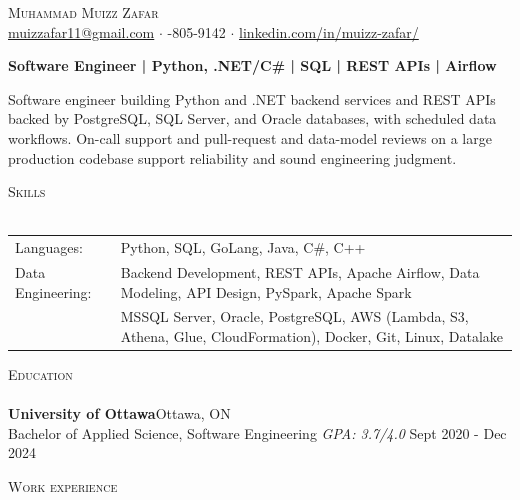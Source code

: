 \documentclass[a4paper]{article}
\newcommand{\lineunder} {
    \vspace*{-8pt} \\
    \hspace*{-18pt} \hrulefill \\
}
\newcommand{\header} [1] {
    {\hspace*{-18pt}\vspace*{6pt} \textsc{#1}}
    \vspace*{-6pt} \lineunder
}
\begin{document}
\vspace*{-40pt}

\vspace*{-10pt}
\begin{center}
	{\Huge \scshape {Muhammad Muizz Zafar}}\\
	\faSend \space \href{mailto:muizzafar11@gmail.com}{muizzafar11@gmail.com} $\cdot$ \faPhoneSquare {}-805-9142 $\cdot$ \faLinkedinSquare \space \href{https://www.linkedin.com/in/muizz-zafar/}{linkedin.com/in/muizz-zafar/}
	\\
\end{center}

\vspace{-5pt}
\begin{center}
\textbf{Software Engineer | Python, .NET/C\# | SQL | REST APIs | Airflow}
\end{center}
\begin{center}
Software engineer building Python and .NET backend services and REST APIs backed by PostgreSQL, SQL Server, and Oracle databases, with scheduled data workflows. On-call support and pull-request and data-model reviews on a large production codebase support reliability and sound engineering judgment.
\end{center}

\header{Skills}
\begin{tabular}{ l l }
	Languages: 
& Python, SQL, GoLang, Java, C\#, C++ \\

Data Engineering: 
& Backend Development, REST APIs, Apache Airflow, Data Modeling, API Design, PySpark, Apache Spark\\
& MSSQL Server, Oracle, PostgreSQL, AWS (Lambda, S3, Athena, Glue, CloudFormation), Docker, Git, Linux, Datalake

\end{tabular}

\header{Education}
\textbf{University of Ottawa}\hfill Ottawa, ON\\
Bachelor of Applied Science, Software Engineering \textit{GPA: 3.7/4.0} \hfill Sept 2020 - Dec 2024\\
\vspace{2mm}

\header{Work experience}
\vspace{1.5mm}
\end{document}
